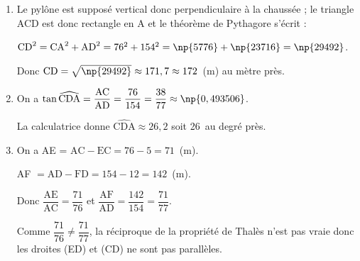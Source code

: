 
\medskip

%
%
%
%
%

\begin{enumerate}
\item %
Le pylône est supposé vertical donc perpendiculaire à la chaussée ; le triangle ACD est donc rectangle en A et le théorème de Pythagore s'écrit :

$\text{CD}^2 = \text{CA}^2 + \text{AD}^2 = 76^2 + 154^2 = \np{5776} + \np{23716} = \np{29492}$.

Donc $\text{CD} = \sqrt{\np{29492}} \approx 171,7 \approx 172$~(m) au mètre près.
\item %

On a $\tan \widehat{\text{CDA}} = \dfrac{\text{AC}}{\text{AD}} = \dfrac{76}{154} = \dfrac{38}{77} \approx \np{0,493506}$.

La calculatrice donne $\widehat{\text{CDA}} \approx 26,2$ soit 26\,\degres{} au degré près.
\item %
On a AE = $\text{AC} - \text{EC} = 76 - 5 = 71$~(m).

AF $ = \text{AD} - \text{FD} = 154 - 12 = 142$~(m).

Donc $\dfrac{\text{AE}}{\text{AC}} = \dfrac{71}{76}$ et $\dfrac{\text{AF}}{\text{AD}} = \dfrac{142}{154} = \dfrac{71}{77}$.

Comme $\dfrac{71}{76} \ne \dfrac{71}{77}$, la réciproque de la propriété de Thalès n'est pas vraie donc les droites (ED) et (CD) ne sont pas parallèles.
\end{enumerate}

\bigskip

